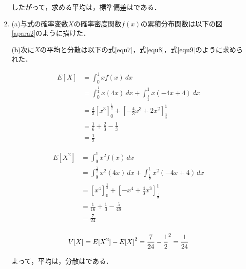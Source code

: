\documentclass[a4paper,10pt]{jarticle}
\begin{document}
\begin{enumerate}
	 したがって，求める平均は，標準偏差はである．

	 \vspace{3mm}

	 \item (a)与式の確率変数$X$の確率密度関数$f(x)$の累積分布関数は以下の図\ref*{apara2}のように描けた．
	 

		(b)次に$X$の平均と分散は以下の式\ref*{equ7}，式\ref*{equ8}，式\ref*{equ9}のように求められた．

		\begin{equation}
			\label{equ7}
			\begin{split}
				E[X] &= \int_{0}^{1} xf(x) \,dx \\
						 &= \int_{0}^{\frac{1}{2}} x(4x) \,dx + \int_{\frac{1}{2}}^{1} x(-4x+4) \,dx \\
						 &= \frac{4}{3}[x^3]_{0}^{\frac{1}{2}}+ [-\frac{4}{3}x^3+2x^2]_{\frac{1}{2}}^{1} \\
						 &= \frac{1}{6}+\frac{2}{3}-\frac{1}{3} \\
						 &= \frac{1}{2}
			\end{split}
		\end{equation}

		\begin{equation}
			\label{equ8}
			\begin{split}
				E[X^2] &= \int_{0}^{1} x^2 f(x) \,dx \\
							 &= \int_{0}^{\frac{1}{2}} x^2(4x) \,dx + \int_{\frac{1}{2}}^{1} x^2(-4x+4) \,dx \\
							 &= [x^4]_{0}^{\frac{1}{2}} + [-x^4+\frac{4}{3}x^3]_{\frac{1}{2}}^{1} \\
							 &= \frac{1}{16}+\frac{1}{3}-\frac{5}{48} \\
							 &= \frac{7}{24} \\
							\end{split}
		\end{equation}

		\begin{equation}
			\label{equ9}
				V[X] = E[X^2]- {E[X]}^2 = \frac{7}{24}-{\frac{1}{2}}^2 =\frac{1}{24} \\
		\end{equation}

よって，平均は，分散はである．

	\end{enumerate}
	\vspace{3mm}

\end{document}
